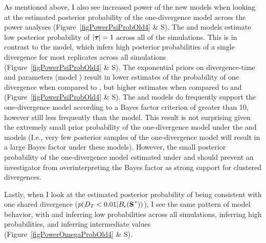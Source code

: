 As mentioned above, I also see increased power of the new models when
looking at the estimated posterior probability of the one-divergence model
across the power analyses 
(Figure~\ref{figPowerPsiProbOld4} \& 
S).
The \modelDPP and \modelUniform models estimate low posterior probability of
$\lvert \boldsymbol{\tau_{}} \rvert = 1$ across all of the simulations.
This is in contrast to the \modelOld model, which infers high posterior probabilities of a single
divergence for most replicates across all simulations
(Figure~\ref{figPowerPsiProbOld4} \& 
S).
The exponential priors on divergence-time and \myTheta{} parameters (model
\modelUshaped) result in lower estimates of the probability of one divergence
when compared to \modelOld, but higher estimates when compared to \modelUniform
and \modelDPP
(Figure~\ref{figPowerPsiProbOld4} \& 
S).
The \modelDPP and \modelUniform models do frequently support the one-divergence
model according to a Bayes factor criterion of greater than 10, however still
less frequently than the \modelOld model.
This result is not surprising given the extremely small prior probability of
the one-divergence model under the \modelDPP and \modelUniform models (I.e.,
very few posterior samples of the one-divergence model will result in a
large Bayes factor under these models).
However, the small posterior probability of the one-divergence model estimated
under \modelDPP and \modelUniform should prevent an investigator from
overinterpreting the Bayes factor as strong support for clustered divergences.

Lastly, when I look at the estimated posterior probability of
\divTimeDispersion being consistent with one shared divergence
($p(\divTimeDispersion < 0.01 | \ssSpace)$), I see the same pattern of model
behavior, with \modelDPP and \modelUniform inferring low probabilities across
all simulations, \modelOld inferring high probabilities, and \modelUshaped
inferring intermediate values
(Figure~\ref{figPowerOmegaProbOld4} \& 
S).

